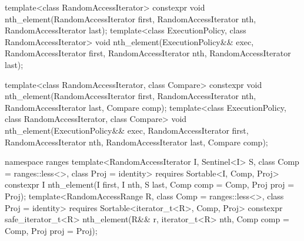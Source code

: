 %
\begin{itemdecl}
template<class RandomAccessIterator>
  constexpr void nth_element(RandomAccessIterator first, RandomAccessIterator nth,
                             RandomAccessIterator last);
template<class ExecutionPolicy, class RandomAccessIterator>
  void nth_element(ExecutionPolicy&& exec,
                   RandomAccessIterator first, RandomAccessIterator nth,
                   RandomAccessIterator last);

template<class RandomAccessIterator, class Compare>
  constexpr void nth_element(RandomAccessIterator first, RandomAccessIterator nth,
                             RandomAccessIterator last,  Compare comp);
template<class ExecutionPolicy, class RandomAccessIterator, class Compare>
  void nth_element(ExecutionPolicy&& exec,
                   RandomAccessIterator first, RandomAccessIterator nth,
                   RandomAccessIterator last, Compare comp);
\end{itemdecl}
\begin{addedblock}
\begin{itemdecl}
namespace ranges {
  template<RandomAccessIterator I, Sentinel<I> S, class Comp = ranges::less<>,
      class Proj = identity>
    requires Sortable<I, Comp, Proj>
    constexpr I
      nth_element(I first, I nth, S last, Comp comp = Comp{}, Proj proj = Proj{});
  template<RandomAccessRange R, class Comp = ranges::less<>, class Proj = identity>
    requires Sortable<iterator_t<R>, Comp, Proj>
    constexpr safe_iterator_t<R>
      nth_element(R&& r, iterator_t<R> nth, Comp comp = Comp{}, Proj proj = Proj{});
}
\end{itemdecl}
\end{addedblock}

